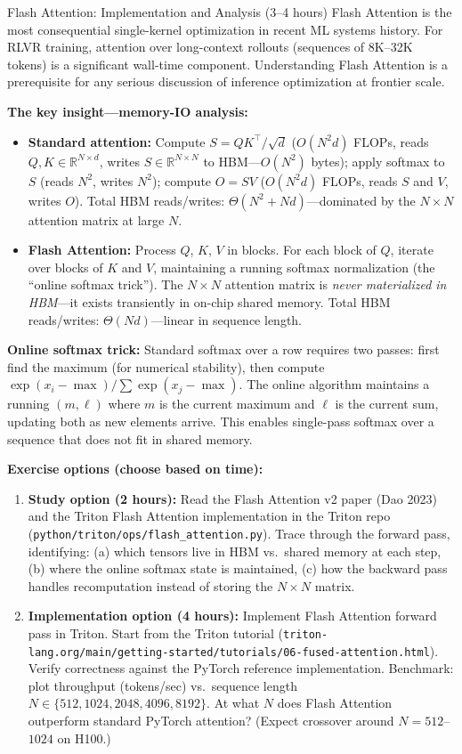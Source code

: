 \begin{exercise}{Flash Attention: Implementation and Analysis (3--4 hours)}
Flash Attention is the most consequential single-kernel optimization in recent ML systems history. For RLVR training, attention over long-context rollouts (sequences of 8K--32K tokens) is a significant wall-time component. Understanding Flash Attention is a prerequisite for any serious discussion of inference optimization at frontier scale.

\textbf{The key insight---memory-IO analysis:}
\begin{itemize}
  \item \textbf{Standard attention:} Compute $S = QK^\top / \sqrt{d}$ ($O(N^2 d)$ FLOPs, reads $Q, K \in \mathbb{R}^{N \times d}$, writes $S \in \mathbb{R}^{N \times N}$ to HBM---$O(N^2)$ bytes); apply softmax to $S$ (reads $N^2$, writes $N^2$); compute $O = S V$ ($O(N^2 d)$ FLOPs, reads $S$ and $V$, writes $O$). Total HBM reads/writes: $\Theta(N^2 + Nd)$---dominated by the $N \times N$ attention matrix at large $N$.
  \item \textbf{Flash Attention:} Process $Q$, $K$, $V$ in blocks. For each block of $Q$, iterate over blocks of $K$ and $V$, maintaining a running softmax normalization (the ``online softmax trick''). The $N \times N$ attention matrix is \textit{never materialized in HBM}---it exists transiently in on-chip shared memory. Total HBM reads/writes: $\Theta(Nd)$---linear in sequence length.
\end{itemize}

\textbf{Online softmax trick:} Standard softmax over a row requires two passes: first find the maximum (for numerical stability), then compute $\exp(x_i - \max) / \sum \exp(x_j - \max)$. The online algorithm maintains a running $(m, \ell)$ where $m$ is the current maximum and $\ell$ is the current sum, updating both as new elements arrive. This enables single-pass softmax over a sequence that does not fit in shared memory.

\textbf{Exercise options (choose based on time):}
\begin{enumerate}
  \item \textbf{Study option (2 hours):} Read the Flash Attention v2 paper (Dao 2023) and the Triton Flash Attention implementation in the Triton repo (\texttt{python/triton/ops/flash\_attention.py}). Trace through the forward pass, identifying: (a) which tensors live in HBM vs.\ shared memory at each step, (b) where the online softmax state is maintained, (c) how the backward pass handles recomputation instead of storing the $N \times N$ matrix.
  \item \textbf{Implementation option (4 hours):} Implement Flash Attention forward pass in Triton. Start from the Triton tutorial (\texttt{triton-lang.org/main/getting-started/tutorials/06-fused-attention.html}). Verify correctness against the PyTorch reference implementation. Benchmark: plot throughput (tokens/sec) vs.\ sequence length $N \in \{512, 1024, 2048, 4096, 8192\}$. At what $N$ does Flash Attention outperform standard PyTorch attention? (Expect crossover around $N = 512$--$1024$ on H100.)
\end{enumerate}


\end{exercise}
